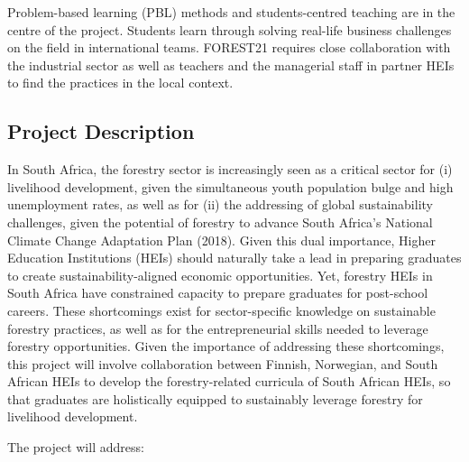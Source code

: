 \documentclass[
  11pt,
]{article}
\begin{document}
Problem-based learning (PBL) methods and students-centred teaching are
in the centre of the project. Students learn through solving real-life
business challenges on the field in international teams. FOREST21
requires close collaboration with the industrial sector as well as
teachers and the managerial staff in partner HEIs to find the practices
in the local context.

\hypertarget{project-description}{%
\subsection{Project Description}\label{project-description}}

In South Africa, the forestry sector is increasingly seen as a critical
sector for (i) livelihood development, given the simultaneous youth
population bulge and high unemployment rates, as well as for (ii) the
addressing of global sustainability challenges, given the potential of
forestry to advance South Africa's National Climate Change Adaptation
Plan (2018). Given this dual importance, Higher Education Institutions
(HEIs) should naturally take a lead in preparing graduates to create
sustainability-aligned economic opportunities. Yet, forestry HEIs in
South Africa have constrained capacity to prepare graduates for
post-school careers. These shortcomings exist for sector-specific
knowledge on sustainable forestry practices, as well as for the
entrepreneurial skills needed to leverage forestry opportunities. Given
the importance of addressing these shortcomings, this project will
involve collaboration between Finnish, Norwegian, and South African HEIs
to develop the forestry-related curricula of South African HEIs, so that
graduates are holistically equipped to sustainably leverage forestry for
livelihood development.

The project will address:
\end{document}
